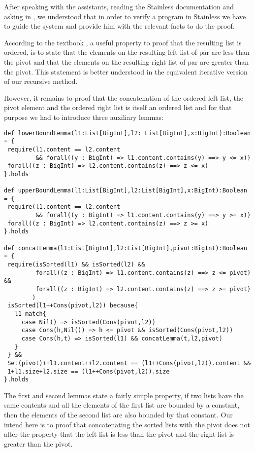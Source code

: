 \documentclass{article}
\begin{document}
After speaking with the assistants, reading the Stainless documentation and asking in \cite{concatenation}, we understood that in order to verify a program in Stainless we have to guide the system and provide him with the relevant facts to do the proof. 

According to the textbook \cite{calculus-of-computation}, a useful property to proof that the resulting list is ordered, is to state that the elements on the resulting left list of par are less than the pivot and that the elements on the resulting right list of par are greater than the pivot. This statement is better understood in the equivalent iterative version of our recursive method.

However, it remains to proof that the concatenation of the ordered left list, the pivot element and the ordered right list is itself an ordered list and for that purpose we had to introduce three auxiliary lemmas: 

\begin{lstlisting}[label={list:first},caption=Auxiliar lemmas in our proof]
def lowerBoundLemma(l1:List[BigInt],l2: List[BigInt],x:BigInt):Boolean = {
 require(l1.content == l2.content 
         && forall((y : BigInt) => l1.content.contains(y) ==> y <= x))
 forall((z : BigInt) => l2.content.contains(z) ==> z <= x) 
}.holds

def upperBoundLemma(l1:List[BigInt],l2:List[BigInt],x:BigInt):Boolean = {
 require(l1.content == l2.content 
         && forall((y : BigInt) => l1.content.contains(y) ==> y >= x))
 forall((z : BigInt) => l2.content.contains(z) ==> z >= x) 
}.holds
  
def concatLemma(l1:List[BigInt],l2:List[BigInt],pivot:BigInt):Boolean = {
 require(isSorted(l1) && isSorted(l2) && 
         forall((z : BigInt) => l1.content.contains(z) ==> z <= pivot) && 
         forall((z : BigInt) => l2.content.contains(z) ==> z >= pivot) 
        )
 isSorted(l1++Cons(pivot,l2)) because{
   l1 match{
     case Nil() => isSorted(Cons(pivot,l2))
     case Cons(h,Nil()) => h <= pivot && isSorted(Cons(pivot,l2))
     case Cons(h,t) => isSorted(l1) && concatLemma(t,l2,pivot)
   }     
 } &&
 Set(pivot)++l1.content++l2.content == (l1++Cons(pivot,l2)).content &&
 1+l1.size+l2.size == (l1++Cons(pivot,l2)).size
}.holds
\end{lstlisting}

The first and second lemmas state a fairly simple property, if two lists have the same contents and all the elements of the first list are bounded by a constant, then the elements of the second list are also bounded by that constant. Our intend here is to proof that concatenating the sorted lists with the pivot  does not alter the property that the left list is less than the pivot and the right list is greater than the pivot. 
\end{document}
